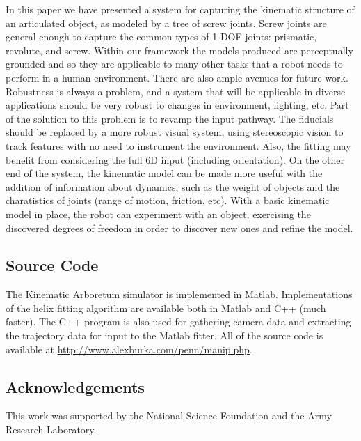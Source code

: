 \documentclass[letterpaper, 10 pt, conference]{ieeeconf}  %
\begin{document}
In this paper we have presented a system for capturing the kinematic structure of an articulated object, as modeled by a tree of screw joints. Screw joints are general enough to capture the common types of 1-DOF joints: prismatic, revolute, and screw. Within our framework the models produced are perceptually grounded and so they are applicable to many other tasks that a robot needs to perform in a human environment. There are also ample avenues for future work. Robustness is always a problem, and a system that will be applicable in diverse applications should be very robust to changes in environment, lighting, etc. Part of the solution to this problem is to revamp the input pathway. The fiducials should be replaced by a more robust visual system, using stereoscopic vision to track features with no need to instrument the environment. Also, the fitting may benefit from considering the full 6D input (including orientation). On the other end of the system, the kinematic model can be made more useful with the addition of information about dynamics, such as the weight of objects and the charatistics of joints (range of motion, friction, etc). With a basic kinematic model in place, the robot can experiment with an object, exercising the discovered degrees of freedom in order to discover new ones and refine the model.

\appendix

\subsection{Source Code} \label{sec:code}
The Kinematic Arboretum simulator is implemented in Matlab. Implementations of the helix fitting algorithm are available both in Matlab and C++ (much faster). The C++ program is also used for gathering camera data and extracting the trajectory data for input to the Matlab fitter. All of the source code is available at \url{http://www.alexburka.com/penn/manip.php}.


\subsection{Acknowledgements}
This work was supported by the National Science Foundation and the Army Research Laboratory.





\end{document}
